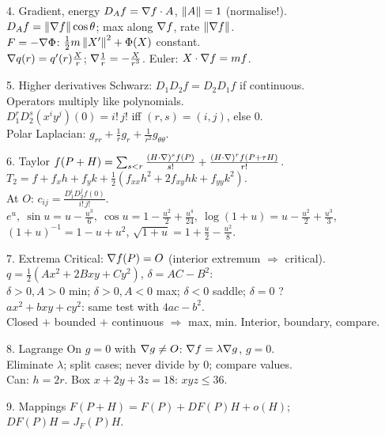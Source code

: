 \begin{tcbraster}[raster columns=2, raster equal height=rows, raster column skip=3mm, raster row skip=3mm]
\begin{fsheet}{4. Gradient, energy}
$D_Af=\nabla f\cdot A$, $\left\lVert A\right\rVert=1$ (normalise!).\\
$D_Af=\left\lVert \nabla f\right\rVert\cos\theta$; max along $\nabla f$, rate $\left\lVert \nabla f\right\rVert$.\\
$F=-\nabla\Phi$: $\tfrac12m\left\lVert X'\right\rVert^2+\Phi(X)$ constant.\\
$\nabla q(r)=q'(r)\frac Xr$; $\nabla\frac1r=-\frac X{r^3}$. Euler: $X\cdot\nabla f=mf$.
\end{fsheet}
\begin{fsheet}{5. Higher derivatives}
Schwarz: $D_1D_2f=D_2D_1f$ if continuous.\\
Operators multiply like polynomials.\\
$D_1^rD_2^s(x^iy^j)(0)=i!\,j!$ iff $(r,s)=(i,j)$, else $0$.\\
Polar Laplacian: $g_{rr}+\frac1rg_r+\frac1{r^2}g_{\theta\theta}$.
\end{fsheet}
\begin{fsheet}{6. Taylor}
$f(P+H)=\sum_{s<r}\frac{(H\cdot\nabla)^sf(P)}{s!}+\frac{(H\cdot\nabla)^rf(P+\tau H)}{r!}$.\\
$T_2=f+f_xh+f_yk+\frac12(f_{xx}h^2+2f_{xy}hk+f_{yy}k^2)$.\\
At $O$: $c_{ij}=\frac{D_1^iD_2^jf(0)}{i!\,j!}$.\\
$e^u,\ \sin u=u-\frac{u^3}6,\ \cos u=1-\frac{u^2}2+\frac{u^4}{24},\ \log(1+u)=u-\frac{u^2}2+\frac{u^3}3$, $(1+u)^{-1}=1-u+u^2$, $\sqrt{1+u}=1+\frac u2-\frac{u^2}8$.
\end{fsheet}
\begin{fsheet}{7. Extrema}
Critical: $\nabla f(P)=O$ (interior extremum $\Rightarrow$ critical).\\
$q=\frac12(Ax^2+2Bxy+Cy^2)$, $\delta=AC-B^2$:\\
$\delta>0,A>0$ min; $\delta>0,A<0$ max; $\delta<0$ saddle; $\delta=0$ ?\\
$ax^2+bxy+cy^2$: same test with $4ac-b^2$.\\
Closed $+$ bounded $+$ continuous $\Rightarrow$ max, min. Interior, boundary, compare.
\end{fsheet}
\begin{fsheet}{8. Lagrange}
On $g=0$ with $\nabla g\ne O$: $\nabla f=\lambda\nabla g$, $g=0$.\\
Eliminate $\lambda$; split cases; never divide by $0$; compare values.\\
Can: $h=2r$. Box $x+2y+3z=18$: $xyz\le36$.
\end{fsheet}
\begin{fsheet}{9. Mappings}
$F(P+H)=F(P)+DF(P)H+o(H)$; $DF(P)H=J_F(P)H$.\\

\end{fsheet}
\end{tcbraster}
